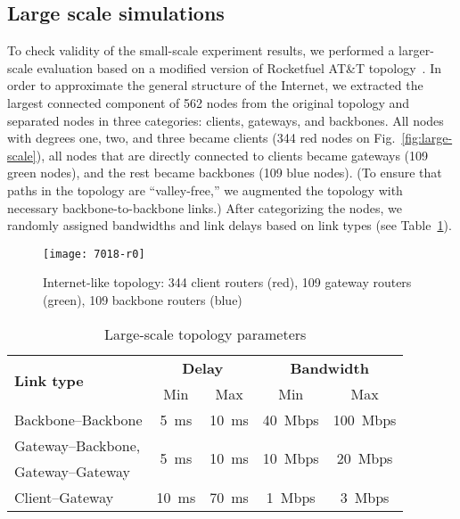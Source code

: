 \subsection{Large scale simulations}
\label{sec:largescale}

To check validity of the small-scale experiment results, we performed a larger-scale evaluation based on a modified version of Rocketfuel AT\&T topology~\cite{rocketfuel}.
In order to approximate the general structure of the Internet,
we extracted the largest connected component of 562 nodes from the original topology and separated nodes in three categories: clients, gateways, and backbones.
All nodes with degrees one, two, and three became clients (344 red nodes on Fig.~\ref{fig:large-scale}), all nodes that are directly connected to clients became gateways (109 green nodes), and the rest became backbones (109 blue nodes).
(To ensure that paths in the topology are ``valley-free,'' we augmented the topology with necessary backbone-to-backbone links.)
After categorizing the nodes, we randomly assigned bandwidths and link delays based on link types (see Table~\ref{tab:large-scale}).

\begin{figure}[htbp]
  \centering
  \texttt{[image: 7018-r0]}
  \caption{Internet-like topology: 344 client routers (red), 109 gateway routers (green), 109 backbone routers (blue)}
  \label{fig:large-scale-topo}
\end{figure}

\begin{table}[htbp]
\centering
\caption{Large-scale topology parameters}
\label{tab:large-scale}
\begin{tabular}{|l||c|c||c|c|}
  \hline
  \multirow{2}{*}{\bf Link type} &  \multicolumn{2}{|c||}{\bf Delay} &  \multicolumn{2}{|c|}{\bf Bandwidth} \tabularnewline
  \cline{2-5}
                        &  Min & Max                       &  Min & Max \tabularnewline
  \hline \hline
  Backbone--Backbone    & 5~ms & 10~ms   & 40~Mbps & 100~Mbps \tabularnewline
  \hline
  Gateway--Backbone,    & \multirow{2}{*}{5~ms} & \multirow{2}{*}{10~ms}   
                        & \multirow{2}{*}{10~Mbps} & \multirow{2}{*}{20~Mbps} \tabularnewline
  Gateway--Gateway      & & & & \\
  \hline
  Client--Gateway       & 10~ms & 70~ms   & 1~Mbps  & 3~Mbps \\
  \hline

\end{tabular}
\end{table}

